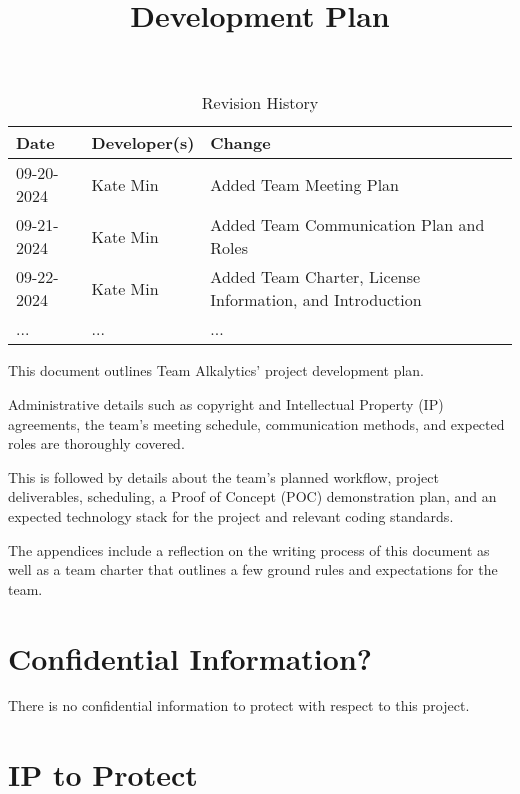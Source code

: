 \documentclass{article}
\title{Development Plan\\\progname}
\author{\authname}
\date{}
\begin{document}
\maketitle

\begin{table}[hp]
\caption{Revision History} \label{TblRevisionHistory}
\begin{tabularx}{\textwidth}{llX}
\toprule
\textbf{Date} & \textbf{Developer(s)} & \textbf{Change}\\
\midrule
09-20-2024 & Kate Min & Added Team Meeting Plan\\
09-21-2024 & Kate Min & Added Team Communication Plan and Roles\\
09-22-2024 & Kate Min & Added Team Charter, License Information, and Introduction\\
... & ... & ...\\
\bottomrule
\end{tabularx}
\end{table}

\newpage{}

\noindent This document outlines Team Alkalytics' project development plan.\newline

\noindent Administrative details such as copyright and Intellectual
Property (IP) agreements, the team's meeting schedule, communication methods,
and expected roles are thoroughly covered.\newline

\noindent This is followed by details about the team's planned workflow, project
deliverables, scheduling, a Proof of Concept (POC) demonstration plan, and an
expected technology stack for the project and relevant coding standards.\newline

\noindent The appendices include a reflection on the writing process of this document as
well as a team charter that outlines a few ground rules and expectations for 
the team.

\section{Confidential Information?}

There is no confidential information to protect with respect to this project.

\section{IP to Protect}
\end{document}
